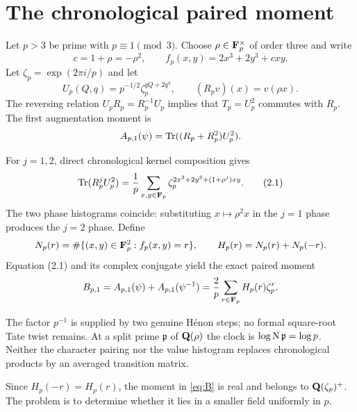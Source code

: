\section{The chronological paired moment}

Let $p>3$ be prime with $p\equiv1\pmod3$.  Choose
$\rho\in\mathbf F_p^\times$ of order three and write
\[
 c=1+\rho=-\rho^2,
 \qquad
 f_p(x,y)=2x^3+2y^3+cxy.
\]
Let $\zeta_p=\exp(2\pi i/p)$ and let
\[
 U_p(Q,q)=p^{-1/2}\zeta_p^{qQ+2q^3},
 \qquad
 (R_pv)(x)=v(\rho x).
\]
The reversing relation $U_pR_p=R_p^{-1}U_p$ implies that
$T_p=U_p^2$ commutes with $R_p$.  The first augmentation moment is
\[
 A_{p,1}(\psi)=\operatorname{Tr}((R_p+R_p^2)U_p^2).
\]

For $j=1,2$, direct chronological kernel composition gives
\[
 \operatorname{Tr}(R_p^jU_p^2)
 =\frac1p\sum_{x,y\in\mathbf F_p}
   \zeta_p^{2x^3+2y^3+(1+\rho^j)xy}. \tag{2.1}
\]
The two phase histograms coincide: substituting $x\mapsto\rho^2x$ in the
$j=1$ phase produces the $j=2$ phase.  Define
\[
 N_p(r)=\#\{(x,y)\in\mathbf F_p^2:f_p(x,y)=r\},
 \qquad
 H_p(r)=N_p(r)+N_p(-r).
\]
Equation (2.1) and its complex conjugate yield the exact paired moment
\begin{equation}\label{eq:B}
 B_{p,1}
 =A_{p,1}(\psi)+A_{p,1}(\psi^{-1})
 =\frac2p\sum_{r\in\mathbf F_p}H_p(r)\zeta_p^r.
\end{equation}

The factor $p^{-1}$ is supplied by two genuine H\'enon steps; no formal
square-root Tate twist remains.  At a split prime $\mathfrak p$ of
$\mathbf Q(\rho)$ the clock is $\log\operatorname{N}\mathfrak p=\log p$.  Neither the
character pairing nor the value histogram replaces chronological products by
an averaged transition matrix.

Since $H_p(-r)=H_p(r)$, the moment in \eqref{eq:B} is real and belongs to
$\mathbf Q(\zeta_p)^+$.  The problem is to determine whether it lies in a smaller
field uniformly in $p$.

